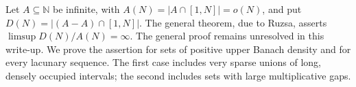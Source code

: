 Let \(A\subseteq\mathbb N\) be infinite, with
\(A(N)=|A\cap[1,N]|=o(N)\), and put
\(D(N)=|(A-A)\cap[1,N]|\).
The general theorem, due to Ruzsa, asserts
\(\limsup D(N)/A(N)=\infty\).
The general proof remains unresolved in this write-up.
We prove the assertion for sets of positive upper
Banach density and for every lacunary sequence.
The first case includes very sparse unions of long,
densely occupied intervals; the second includes sets
with large multiplicative gaps.
